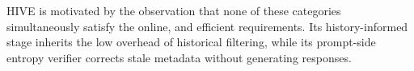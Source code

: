 HIVE is motivated by the observation that none of these categories simultaneously satisfy the online, and efficient requirements. Its history-informed stage inherits the low overhead of historical filtering, while its prompt-side entropy verifier corrects stale metadata without generating responses.
